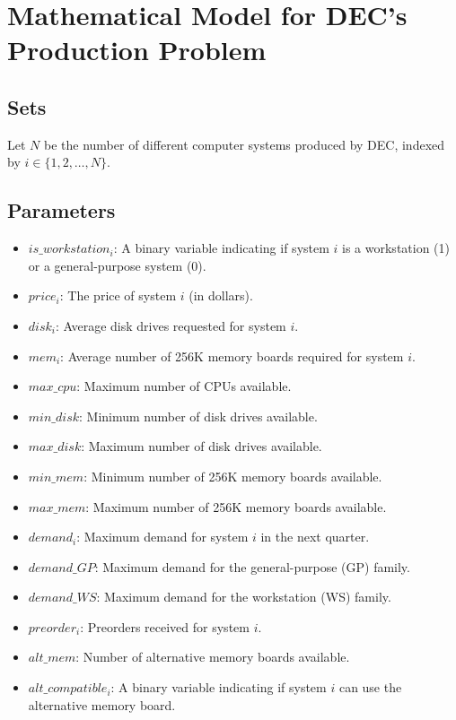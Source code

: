 \documentclass{article}
\begin{document}
\section*{Mathematical Model for DEC's Production Problem}

\subsection*{Sets}
Let \( N \) be the number of different computer systems produced by DEC, indexed by \( i \in \{1, 2, \ldots, N\} \).

\subsection*{Parameters}
\begin{itemize}
    \item \( is\_workstation_i \): A binary variable indicating if system \( i \) is a workstation (1) or a general-purpose system (0).
    \item \( price_i \): The price of system \( i \) (in dollars).
    \item \( disk_i \): Average disk drives requested for system \( i \).
    \item \( mem_i \): Average number of 256K memory boards required for system \( i \).
    \item \( max\_cpu \): Maximum number of CPUs available.
    \item \( min\_disk \): Minimum number of disk drives available.
    \item \( max\_disk \): Maximum number of disk drives available.
    \item \( min\_mem \): Minimum number of 256K memory boards available.
    \item \( max\_mem \): Maximum number of 256K memory boards available.
    \item \( demand_i \): Maximum demand for system \( i \) in the next quarter.
    \item \( demand\_GP \): Maximum demand for the general-purpose (GP) family.
    \item \( demand\_WS \): Maximum demand for the workstation (WS) family.
    \item \( preorder_i \): Preorders received for system \( i \).
    \item \( alt\_mem \): Number of alternative memory boards available.
    \item \( alt\_compatible_i \): A binary variable indicating if system \( i \) can use the alternative memory board.
\end{itemize}
\end{document}
